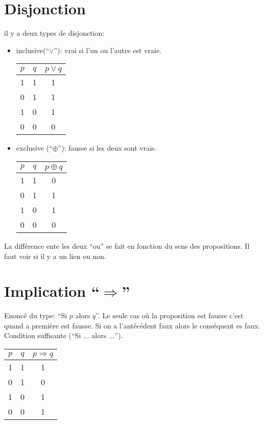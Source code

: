 \section{Disjonction}
il y a deux types de disjonction:
\begin{itemize}
	\item inclusive(``$\lor$''): vrai si l'un ou l'autre est vraie.\\
		\begin{center}
			\begin{tabular}{|c|c||c|}
				\hline
				$p$&$q$& $p \lor q$\\
				\hline
				1&1&1\\
				\hline
				0&1&1\\
				\hline
				1&0&1\\
				\hline
				0&0&0\\
				\hline
			\end{tabular}
		\end{center}
	\item exclusive (``$\oplus$''): fausse si les deux sont vrais.\\
		\begin{center}
			\begin{tabular}{|c|c||c|}
				\hline
				$p$&$q$&$p \oplus q$\\
				\hline
				1&1&0\\
				\hline
				0&1&1\\
				\hline
				1&0&1\\
				\hline
				0&0&0\\
				\hline
			\end{tabular}
		\end{center}
\end{itemize}
La différence ente les deux ``ou'' se fait en fonction du sens des propositions.
Il faut voir si il y a un lien  ou non.
\section{Implication ``$\Rightarrow$''}
Enoncé du type: ``Si $p$ alors $q$''.
Le seule cas où la proposition est fausse c'est quand a première est fausse.
Si on a l'antécédent faux alors le conséquent es faux.
Condition suffisante (``Si $...$ alors $...$'').
\begin{center}
	\begin{tabular}{|c|c||c|}
		\hline
		$p$&$q$&$p \Rightarrow q$\\
		\hline
		1&1&1\\
		\hline
		0&1&0\\
		\hline
		1&0&1\\
		\hline
		0&0&1\\
		\hline
	\end{tabular}
\end{center}
